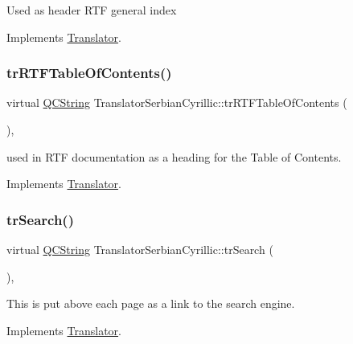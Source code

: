 Used as header R\+TF general index 

Implements \mbox{\hyperlink{class_translator}{Translator}}.

\mbox{\label{class_translator_serbian_cyrillic_a2f31d5298e5c2698b083c86a49d0b411}} 
\subsubsection{\texorpdfstring{trRTFTableOfContents()}{trRTFTableOfContents()}}
{\footnotesize\ttfamily virtual \mbox{\hyperlink{class_q_c_string}{Q\+C\+String}} Translator\+Serbian\+Cyrillic\+::tr\+R\+T\+F\+Table\+Of\+Contents (\begin{DoxyParamCaption}{ }\end{DoxyParamCaption})\hspace{0.3cm}{\ttfamily [inline]}, {\ttfamily [virtual]}}

used in R\+TF documentation as a heading for the Table of Contents. 

Implements \mbox{\hyperlink{class_translator}{Translator}}.

\mbox{\label{class_translator_serbian_cyrillic_a447e13ea8e6226bfa87bf2c30c0ae930}} 
\subsubsection{\texorpdfstring{trSearch()}{trSearch()}}
{\footnotesize\ttfamily virtual \mbox{\hyperlink{class_q_c_string}{Q\+C\+String}} Translator\+Serbian\+Cyrillic\+::tr\+Search (\begin{DoxyParamCaption}{ }\end{DoxyParamCaption})\hspace{0.3cm}{\ttfamily [inline]}, {\ttfamily [virtual]}}

This is put above each page as a link to the search engine. 

Implements \mbox{\hyperlink{class_translator}{Translator}}.

\mbox{\label{class_translator_serbian_cyrillic_aa1bd3e4ec1c320b219d32515055d27a5}} 
